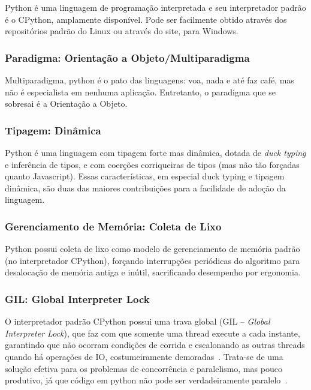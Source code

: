 \documentclass[12pt,a4paper]{article}
\begin{document}
Python é uma linguagem de programação interpretada e seu interpretador padrão é o CPython, amplamente disponível. Pode ser facilmente obtido através dos repositórios padrão do Linux ou através do site, para Windows.

\subsubsection{Paradigma: Orientação a Objeto/Multiparadigma}
\label{sssec:python paradigma}

Multiparadigma, python é o pato das linguagens: voa, nada e até faz café, mas não é especialista em nenhuma aplicação. Entretanto, o paradigma que se sobresai é a Orientação a Objeto.

\subsubsection{Tipagem: Dinâmica}
\label{sssec:python tipagem}

Python é uma linguagem com tipagem forte mas dinâmica, dotada de \emph{duck typing} e inferência de tipos, e com coerções corriqueiras de tipos (mas não tão forçadas quanto Javascript). Essas características, em especial duck typing e tipagem dinâmica, são duas das maiores contribuições para a facilidade de adoção da linguagem.

\subsubsection{Gerenciamento de Memória: Coleta de Lixo}
\label{sssec:python memoria}

Python possui coleta de lixo como modelo de gerenciamento de memória padrão (no interpretador CPython), forçando interrupções periódicas do algoritmo para desalocação de memória antiga e inútil, sacrificando desempenho por ergonomia.

\subsubsection{GIL: Global Interpreter Lock}
\label{sssec:python gil}

O interpretador padrão CPython possui uma trava global (GIL -- {\it Global Interpreter Lock}), que faz com que somente uma thread execute a cada instante, garantindo que não ocorram condições de corrida e escalonando as outras threads quando há operações de IO, costumeiramente demoradas~\cite{lutz2001programming}. Trata-se de uma solução efetiva para os problemas de concorrência e paralelismo, mas pouco produtivo, já que código em python não pode ser verdadeiramente paralelo~\cite{lutz2001programming}.
\end{document}
